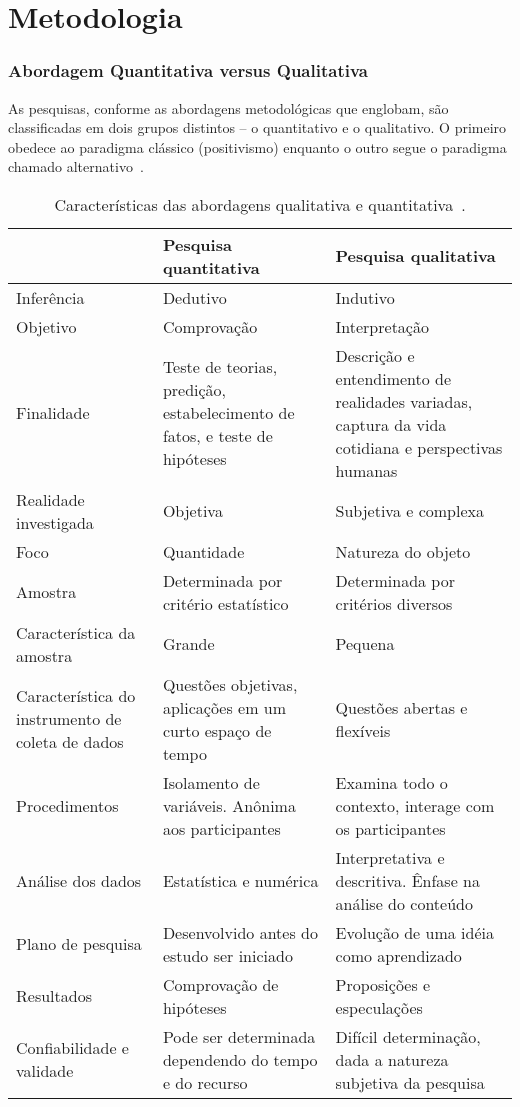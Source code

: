 \chapter{Metodologia}
\label{sec:metodologia}

\subsection{Abordagem Quantitativa versus Qualitativa}

As pesquisas, conforme as abordagens metodológicas que englobam, são classificadas em
dois grupos distintos – o quantitativo e o qualitativo. O primeiro obedece ao paradigma
clássico (positivismo) enquanto o outro segue o paradigma chamado alternativo~\cite{terence2006abordagem}.

\newpage
\begin{table}[htb]
\center
\footnotesize
\begin{tabular}{|p{4cm}|p{5cm}|p{5cm}|}
  \hline
   \textbf{} & \textbf{Pesquisa quantitativa}  & \textbf{Pesquisa qualitativa}\\
    \hline
   	Inferência & Dedutivo & Indutivo\\
   \hline    
    	Objetivo & Comprovação & Interpretação\\
   \hline
	Finalidade & Teste de teorias, predição, estabelecimento de fatos, e teste de hipóteses & Descrição e entendimento de realidades variadas, captura da vida cotidiana e perspectivas humanas\\
   \hline
	Realidade investigada & Objetiva & Subjetiva e complexa\\
   \hline
	Foco & Quantidade & Natureza do objeto\\
   \hline
	Amostra & Determinada por critério estatístico & Determinada por critérios diversos\\
   \hline
	Característica da amostra & Grande & Pequena\\
   \hline
	Característica do instrumento de coleta de dados & Questões objetivas, aplicações em um curto espaço de tempo & Questões abertas e flexíveis\\
   \hline
	Procedimentos & Isolamento de variáveis. Anônima aos participantes & Examina todo o contexto, interage com os participantes\\
   \hline
	Análise dos dados & Estatística e numérica & Interpretativa e descritiva. Ênfase na análise do conteúdo\\
   \hline
	Plano de pesquisa & Desenvolvido antes do estudo ser iniciado & Evolução de uma idéia como aprendizado\\
   \hline
	Resultados & Comprovação de hipóteses & Proposições e especulações\\
   \hline
	Confiabilidade e validade & Pode ser determinada dependendo do tempo e do recurso & Difícil determinação, dada a natureza subjetiva da pesquisa\\
   \hline
\end{tabular}
\caption{Características das abordagens qualitativa e quantitativa~\cite{terence2006abordagem}.}
\end{table}


